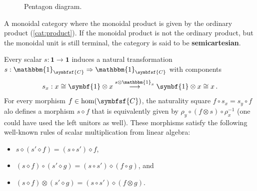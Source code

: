     \begin{figure}[ht!]
        \centering
        \caption{Pentagon diagram.}
        \label{fig:pentagon_diagram}
    \end{figure}

    \begin{example}\label{cat:semicartesian}
        A monoidal category where the monoidal product is given by the ordinary product (\cref{cat:product}). If the monoidal product is not the ordinary product, but the monoidal unit is still terminal, the category is said to be \textbf{semicartesian}.
    \end{example}

    \begin{property}
        Every scalar $s:\symbf{1}\rightarrow\symbf{1}$ induces a natural transformation $s:\mathbbm{1}_{\symbfsf{C}}\Rightarrow\mathbbm{1}_{\symbfsf{C}}$ with components
        \begin{gather}
            s_x:x\cong\symbf{1}\otimes x\overset{s\otimes\mathbbm{1}_x}{\longrightarrow}\symbf{1}\otimes x\cong x\,.
        \end{gather}
        For every morphism $f\in\mathrm{hom}(\symbfsf{C})$, the naturality square $f\circ s_x=s_y\circ f$ alo defines a morphism $s\diamond f$ that is equivalently given by $\rho_y\circ(f\otimes s)\circ\rho^{-1}_x$ (one could have used the left unitors as well). These morphisms satisfy the following well-known rules of scalar multiplication from linear algebra:
        \begin{itemize}
            \item $s\diamond(s'\diamond f) = (s\circ s')\diamond f$,
            \item $(s\diamond f)\circ(s'\diamond g) = (s\circ s')\diamond(f\circ g)$, and
            \item $(s\diamond f)\otimes(s'\diamond g) = (s\circ s')\diamond(f\otimes g)$.
        \end{itemize}
    \end{property}


